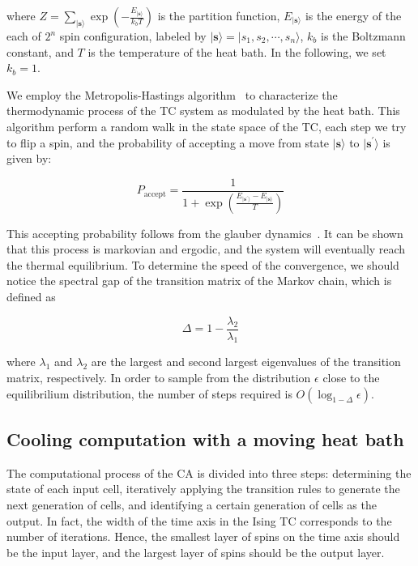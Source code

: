 \documentclass[twocolumn,superscriptaddress,english,showpacs,longbibliography]{revtex4-2}
\begin{document}
where $Z = \sum_{|\mathbf{s}\rangle} \exp\left(-\frac{E_{|\mathbf{s}\rangle}}{k_bT}\right)$ is the partition function, 
$E_{|\mathbf{s}\rangle}$ is the energy of the each of $2^n$ spin configuration, labeled by $|\mathbf{s}\rangle = |s_1, s_2, \cdots, s_n\rangle$, $k_b$ is the Boltzmann constant, and $T$ is the temperature of the heat bath. 
In the following, we set $k_b = 1$.

We employ the Metropolis-Hastings algorithm~\cite{metropolis1953equation} to characterize the thermodynamic process of the TC system as modulated by the heat bath.
This algorithm perform a random walk in the state space of the TC, each step we try to flip a spin,
and the probability of accepting a move from state $|\mathbf{s}\rangle$ to $|\mathbf{s}^\prime\rangle$ is given by:

\begin{equation}
    P_{\text{accept}} = \frac{1}{1+\exp\left(\frac{E_{|\mathbf{s}^\prime\rangle} - E_{|\mathbf{s}\rangle}}{T}\right)}
\end{equation}

This accepting probability follows from the glauber dynamics~\cite{glauber1963time}.
It can be shown that this process is markovian and ergodic, and the system will eventually reach the thermal equilibrium.
To determine the speed of the convergence, we should notice the spectral gap of the transition matrix of the Markov chain, which is defined as

\begin{equation}
    \Delta = 1 - \frac{\lambda_2}{\lambda_1}
\end{equation}

where $\lambda_1$ and $\lambda_2$ are the largest and second largest eigenvalues of the transition matrix, respectively.
In order to sample from the distribution $\epsilon$ close to the equilibrilium distribution, the number of steps required is $O(\log_{1-\Delta} \epsilon)$.

\subsection{Cooling computation with a moving heat bath}\label{cooling-computation-with-moving-heat-bath}

The computational process of the CA is divided into three steps: determining the state of each input cell, iteratively applying the transition rules to generate the next generation of cells, and identifying a certain generation of cells as the output. In fact, the width of the time axis in the Ising TC corresponds to the number of iterations. Hence, the smallest layer of spins on the time axis should be the input layer, and the largest layer of spins should be the output layer. 
\end{document}
